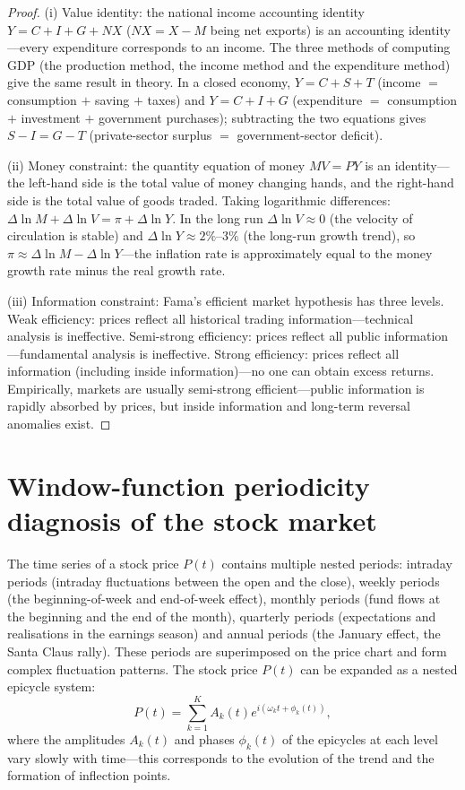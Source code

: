 \begin{proof}
(i) Value identity: the national income accounting identity $Y = C + I + G + NX$ ($NX = X - M$ being net exports) is an accounting identity---every expenditure corresponds to an income. The three methods of computing GDP (the production method, the income method and the expenditure method) give the same result in theory. In a closed economy, $Y = C + S + T$ (income $=$ consumption $+$ saving $+$ taxes) and $Y = C + I + G$ (expenditure $=$ consumption $+$ investment $+$ government purchases); subtracting the two equations gives $S - I = G - T$ (private-sector surplus $=$ government-sector deficit).

(ii) Money constraint: the quantity equation of money $MV = PY$ is an identity---the left-hand side is the total value of money changing hands, and the right-hand side is the total value of goods traded. Taking logarithmic differences: $\Delta\ln M + \Delta\ln V = \pi + \Delta\ln Y$. In the long run $\Delta\ln V \approx 0$ (the velocity of circulation is stable) and $\Delta\ln Y \approx 2\%$--$3\%$ (the long-run growth trend), so $\pi \approx \Delta\ln M - \Delta\ln Y$---the inflation rate is approximately equal to the money growth rate minus the real growth rate.

(iii) Information constraint: Fama's efficient market hypothesis has three levels. Weak efficiency: prices reflect all historical trading information---technical analysis is ineffective. Semi-strong efficiency: prices reflect all public information---fundamental analysis is ineffective. Strong efficiency: prices reflect all information (including inside information)---no one can obtain excess returns. Empirically, markets are usually semi-strong efficient---public information is rapidly absorbed by prices, but inside information and long-term reversal anomalies exist.
\end{proof}

\section{Window-function periodicity diagnosis of the stock market}

\begin{definition}\label{def:stock_price_cycle}
The time series of a stock price $P(t)$ contains multiple nested periods: intraday periods (intraday fluctuations between the open and the close), weekly periods (the beginning-of-week and end-of-week effect), monthly periods (fund flows at the beginning and the end of the month), quarterly periods (expectations and realisations in the earnings season) and annual periods (the January effect, the Santa Claus rally). These periods are superimposed on the price chart and form complex fluctuation patterns. The stock price $P(t)$ can be expanded as a nested epicycle system:
\[
P(t) = \sum_{k=1}^{K} A_k(t) e^{i(\omega_k t + \phi_k(t))},
\]
where the amplitudes $A_k(t)$ and phases $\phi_k(t)$ of the epicycles at each level vary slowly with time---this corresponds to the evolution of the trend and the formation of inflection points.
\end{definition}

